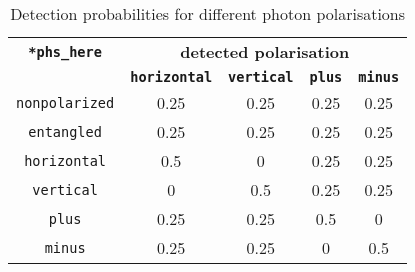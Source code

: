 \begin{table}[H]
\begin{tabular}{ | c | c | c | c | c | }
\hline
  \textbf{\texttt{*phs\_here}} & \multicolumn{4}{c|}{\textbf{detected polarisation}} \\
\cline{2-5}
   & \textbf{\texttt{horizontal}} & \textbf{\texttt{vertical}} & \textbf{\texttt{plus}} & \textbf{\texttt{minus}} \\
\hline \hline
  \texttt{nonpolarized} & 0.25 & 0.25 & 0.25 & 0.25 \\
\hline
  \texttt{entangled} & 0.25 & 0.25 & 0.25 & 0.25 \\
\hline
  \texttt{horizontal} & 0.5 & 0 & 0.25 & 0.25 \\
\hline
  \texttt{vertical} & 0 & 0.5 & 0.25 & 0.25 \\
\hline
  \texttt{plus} & 0.25 & 0.25 & 0.5 & 0 \\
\hline
  \texttt{minus} & 0.25 & 0.25 & 0 & 0.5 \\
\hline
\end{tabular}
\caption{Detection probabilities for different photon polarisations}
\label{tab:comp_detector_detopt_prob}
\end{table}

